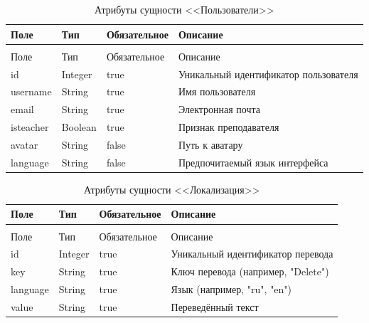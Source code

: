 \begin{xltabular}{\textwidth}{|l|l|p{3.2cm}|X|}
  \caption{Атрибуты сущности <<Пользователи>>\label{users:table}}\\ \hline
  Поле & Тип & Обязательное & Описание \\ \hline
  \endfirsthead
  \\ \hline
  Поле & Тип & Обязательное & Описание \\ \hline
  \endhead
  id & Integer & true & Уникальный идентификатор пользователя \\ \hline
  username & String & true & Имя пользователя \\ \hline
  email & String & true & Электронная почта \\ \hline
  isteacher & Boolean & true & Признак преподавателя \\ \hline
  avatar & String & false & Путь к аватару \\ \hline
  language & String & false & Предпочитаемый язык интерфейса \\ \hline
\end{xltabular}

\begin{xltabular}{\textwidth}{|l|l|p{3.2cm}|X|}
  \caption{Атрибуты сущности <<Локализация>>\label{localization:table}}\\ \hline
  Поле & Тип & Обязательное & Описание \\ \hline
  \endfirsthead
  \\ \hline
  Поле & Тип & Обязательное & Описание \\ \hline
  \endhead
  id & Integer & true & Уникальный идентификатор перевода \\ \hline
  key & String & true & Ключ перевода (например, "Delete") \\ \hline
  language & String & true & Язык (например, "ru", "en") \\ \hline
  value & String & true & Переведённый текст \\ \hline
\end{xltabular}

